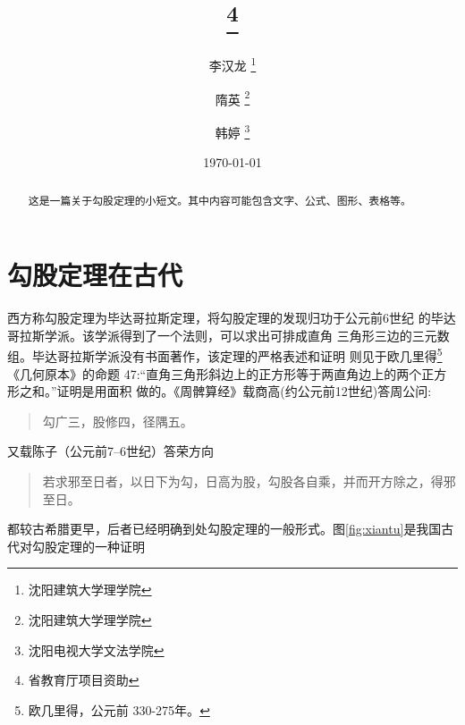 \documentclass[UTF8]{ctexart}
\newenvironment{myquote}{\begin{quote}\kaishu\zihao{-5}}{\end{quote}}%
\begin{document}
\pagestyle{plain}
\title{\thanks{省教育厅项目资助}}%
\pagestyle{plain}%
\author{\kaishu 李汉龙 \thanks {沈阳建筑大学理学院}
\and \kaishu 隋英 \thanks {沈阳建筑大学理学院}
\and \kaishu 韩婷  \thanks{沈阳电视大学文法学院}}
\date{\today} %
\maketitle %
\listoftables %
\begin{abstract}
    这是一篇关于勾股定理的小短文。其中内容可能包含文字、公式、图形、表格等。
\end{abstract}
\tableofcontents %
\section{勾股定理在古代}  
\label{sec:ancient}
西方称勾股定理为毕达哥拉斯定理，将勾股定理的发现归功于公元前6世纪
的毕达哥拉斯学派\cite{Kline}。该学派得到了一个法则，可以求出可排成直角
三角形三边的三元数组。毕达哥拉斯学派没有书面著作，该定理的严格表述和证明
则见于欧几里得\footnote{欧几里得，公元前 330-275年。}《几何原本》的命题 
47:“直角三角形斜边上的正方形等于两直角边上的两个正方形之和。”证明是用面积
做的。《周髀算经》载商高(约公元前12世纪)答周公问:
\begin{myquote}  
勾广三，股修四，径隅五。
\end{myquote}
又载陈子（公元前7--6世纪）答荣方向
\begin{myquote}
若求邪至日者，以日下为勾，日高为股，勾股各自乘，并而开方除之，得邪至日。
\end{myquote}  
都较古希腊更早，后者已经明确到处勾股定理的一般形式。图\ref{fig:xiantu}是我国古代对勾股定理的一种证明\cite{quanjing}  
\end{document}
